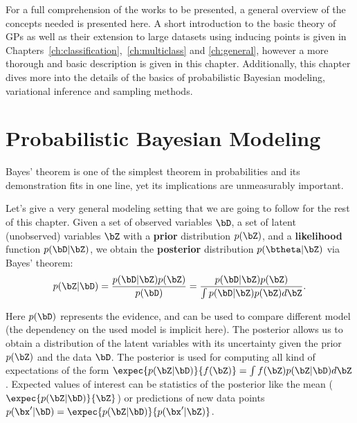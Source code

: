 


\graphicspath{{2_background/figures/}}

For a full comprehension of the works to be presented, a general overview of the concepts needed is presented here.
A short introduction to the basic theory of \acl{GPs} as well as their extension to large datasets using inducing points \cite{Titsias2009} is given in Chapters~\ref{ch:classification},~\ref{ch:multiclass} and \ref{ch:general}, however a more thorough and basic description is given in this chapter.
Additionally, this chapter dives more into the details of the basics of probabilistic Bayesian modeling, variational inference and sampling methods.


\section{Probabilistic Bayesian Modeling}

\label{sec:prob_bayes}

Bayes' theorem is one of the simplest theorem in probabilities and its demonstration fits in one line, yet its implications are unmeasurably important.

Let's give a very general modeling setting that we are going to follow for the rest of this chapter.
Given a set of observed variables $\bD$, a set of latent (unobserved) variables $\bZ$ with a \textbf{prior} distribution $p(\bZ)$, and a \textbf{likelihood} function $p(\bD|\bZ)$, we obtain the \textbf{posterior} distribution $p(\btheta|\bZ)$ via Bayes' theorem:
\begin{align}
p(\bZ|\bD) = \frac{p(\bD|\bZ)p(\bZ)}{p(\bD)} = \frac{p(\bD|\bZ)p(\bZ)}{\int p(\bD|\bZ)p(\bZ)d\bZ}.
\label{eq:bayes}
\end{align}

Here $p(\bD)$ represents the evidence, and can be used to compare different model (the dependency on the used model is implicit here).
The posterior allows us to obtain a distribution of the latent variables with its uncertainty given the prior $p(\bZ)$ and the data $\bD$.
The posterior is used for computing all kind of expectations of the form $\expec{p(\bZ|\bD)}{f(\bZ)} = \int f(\bZ)p(\bZ|\bD)d\bZ$.
Expected values of interest can be statistics of the posterior like the mean ($\expec{p(\bZ|\bD)}{\bZ}$) or predictions of new data points $p(\bx'|\bD) = \expec{p(\bZ|\bD)}{p(\bx'|\bZ)}$.

